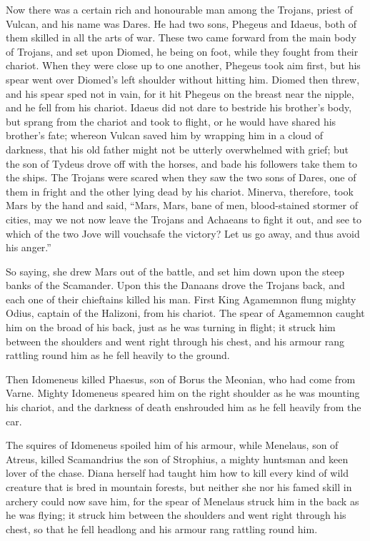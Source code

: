 Now there was a certain rich and honourable man among the Trojans, priest
of Vulcan, and his name was Dares. He had two sons, Phegeus and Idaeus,
both of them skilled in all the arts of war. These two came forward from
the main body of Trojans, and set upon Diomed, he being on foot, while
they fought from their chariot. When they were close up to one another,
Phegeus took aim first, but his spear went over Diomed’s left shoulder
without hitting him. Diomed then threw, and his spear sped not in vain,
for it hit Phegeus on the breast near the nipple, and he fell from his
chariot. Idaeus did not dare to bestride his brother’s body, but sprang
from the chariot and took to flight, or he would have shared his brother’s
fate; whereon Vulcan saved him by wrapping him in a cloud of darkness,
that his old father might not be utterly overwhelmed with grief; but the
son of Tydeus drove off with the horses, and bade his followers take them
to the ships. The Trojans were scared when they saw the two sons of Dares,
one of them in fright and the other lying dead by his chariot. Minerva,
therefore, took Mars by the hand and said, “Mars, Mars, bane of men,
blood-stained stormer of cities, may we not now leave the Trojans and
Achaeans to fight it out, and see to which of the two Jove will vouchsafe
the victory? Let us go away, and thus avoid his anger.”

So saying, she drew Mars out of the battle, and set him down upon the
steep banks of the Scamander. Upon this the Danaans drove the Trojans
back, and each one of their chieftains killed his man. First King
Agamemnon flung mighty Odius, captain of the Halizoni, from his chariot.
The spear of Agamemnon caught him on the broad of his back, just as he was
turning in flight; it struck him between the shoulders and went right
through his chest, and his armour rang rattling round him as he fell
heavily to the ground.

Then Idomeneus killed Phaesus, son of Borus the Meonian, who had come from
Varne. Mighty Idomeneus speared him on the right shoulder as he was
mounting his chariot, and the darkness of death enshrouded him as he fell
heavily from the car.

The squires of Idomeneus spoiled him of his armour, while Menelaus, son of
Atreus, killed Scamandrius the son of Strophius, a mighty huntsman and
keen lover of the chase. Diana herself had taught him how to kill every
kind of wild creature that is bred in mountain forests, but neither she
nor his famed skill in archery could now save him, for the spear of
Menelaus struck him in the back as he was flying; it struck him between
the shoulders and went right through his chest, so that he fell headlong
and his armour rang rattling round him.


